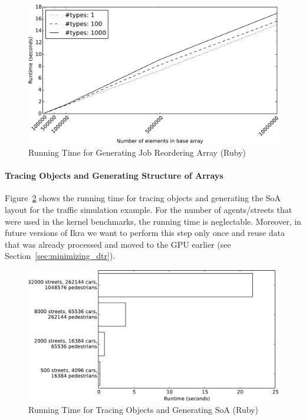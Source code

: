 \documentclass[preprint]{sigplanconf}
\begin{document}
\begin{figure}[!htp]
    \includegraphics[width=\columnwidth]{plot_reorder.pdf}
    \centering
    \caption{Running Time for Generating Job Reordering Array (Ruby)}
    \label{fig:job_reorder_arr}
\end{figure}

\paragraph{Tracing Objects and Generating Structure of Arrays}
Figure~\ref{fig:tracing} shows the running time for tracing objects and generating the SoA layout for the traffic simulation example. For the number of agents/streets that were used in the kernel benchmarks, the running time is neglectable. Moreover, in future versions of Ikra we want to perform this step only once and reuse data that was already processed and moved to the GPU earlier (see Section~\ref{sec:minimizing_dtr}).

\begin{figure}[!htp]
    \includegraphics[width=\columnwidth]{obj_tracer.pdf}
    \centering
    \caption{Running Time for Tracing Objects and Generating SoA (Ruby)}
    \label{fig:tracing}
\end{figure}
\end{document}
